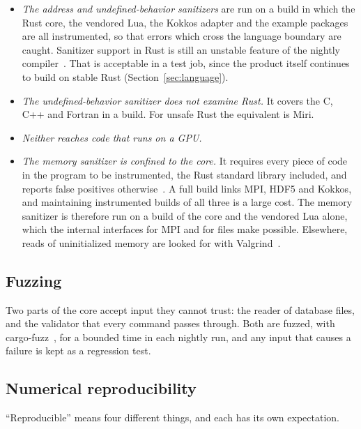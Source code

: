 \documentclass[11pt,a4paper]{article}
\begin{document}
\begin{itemize}
  \item \emph{The address and undefined-behavior sanitizers} are run on a
        build in which the Rust core, the vendored Lua, the Kokkos adapter
        and the example packages are all instrumented, so that errors which
        cross the language boundary are caught.  Sanitizer support in Rust
        is still an unstable feature of the nightly
        compiler~\cite{rustsanitizers}.  That is acceptable in a test job,
        since the product itself continues to build on stable Rust
        (Section~\ref{sec:language}).
  \item \emph{The undefined-behavior sanitizer does not examine Rust.}  It
        covers the C, C++ and Fortran in a build.  For unsafe Rust the
        equivalent is Miri.
  \item \emph{Neither reaches code that runs on a GPU.}
  \item \emph{The memory sanitizer is confined to the core.}  It requires
        every piece of code in the program to be instrumented, the Rust
        standard library included, and reports false positives
        otherwise~\cite{rustsanitizers}.  A full build links MPI, HDF5 and
        Kokkos, and maintaining instrumented builds of all three is a large
        cost.  The memory sanitizer is therefore run on a build of the core
        and the vendored Lua alone, which the internal interfaces for MPI
        and for files make possible.  Elsewhere, reads of uninitialized
        memory are looked for with Valgrind~\cite{valgrind}.
\end{itemize}

\subsection{Fuzzing}
\label{sec:fuzzing}

Two parts of the core accept input they cannot trust: the reader of
database files, and the validator that every command passes through.  Both
are fuzzed, with cargo-fuzz~\cite{cargofuzz}, for a bounded time in each
nightly run, and any input that causes a failure is kept as a regression
test.

\subsection{Numerical reproducibility}
\label{sec:reproducibility}

\enquote{Reproducible} means four different things, and each has its own
expectation.
\end{document}
